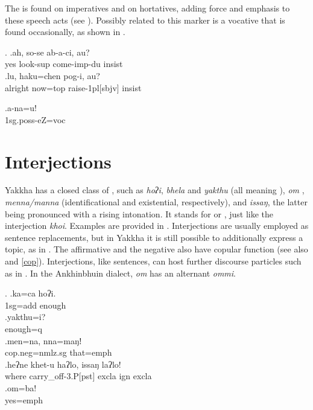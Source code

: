 The  is found on imperatives and on hortatives, adding force and emphasis to these speech acts (see \Next). 
Possibly related to this marker is a  vocative that is found occasionally, as shown in \NNext. 

\ex. \ag.ah,    so-se           ab-a-ci,              au?\\
yes look{\sc -sup} come{\sc -imp-du} {\sc insist}\\
 
\bg.lu,     haku=chen   pog-i,         au?\\
alright now{\sc =top} raise{\sc -1pl[sbjv]} {\sc insist}\\
 

 
 \exg.a-na=u!\\
 {\sc 1sg.poss-}eZ=voc\\



\section{Interjections}\label{interjections}
 
 
 Yakkha has a closed class of , such as \emph{hoʔi}, \emph{bhela} and \emph{yakthu} (all meaning ), \emph{om} , \emph{menna/manna}  (identificational and existential, respectively), and \emph{issaŋ}, the latter being pronounced with a rising intonation. It stands for   or , just like the  interjection \emph{khoi}. Examples are provided in \Next. Interjections are usually employed as sentence replacements, but in Yakkha it is still possible to additionally  express a topic, as in \Next[a]. The affirmative and the negative  also have copular function (see also  and \ref{cop}). Interjections, like sentences, can host further discourse particles such as in \Next[d]. In the Ankhinbhuin dialect, \emph{om} has an alternant \emph{ommi}. 
 
 \ex. \ag.ka=ca hoʔi.\\
 {\sc 1sg=add} enough\\
 \bg.yakthu=i?\\
 enough{\sc =q}\\
 \bg.men=na, nna=maŋǃ\\
 {\sc cop.neg=nmlz.sg} that{\sc =emph}\\
 \bg.heʔne khet-u haʔlo,                 issaŋ       laʔlo!\\
 where carry\_off{\sc -3.P[pst]}  {\sc excla} {\sc ign} {\sc excla}\\
  
 \bg.om=ba!\\
 yes{\sc =emph}\\
 
